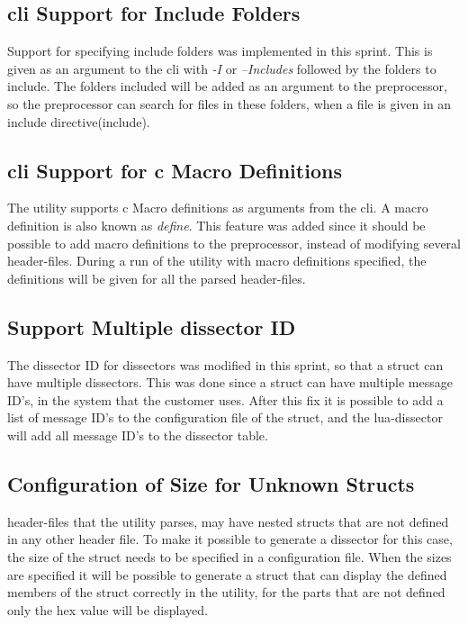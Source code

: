 \subsection{\gls{cli} Support for Include Folders}
Support for specifying include folders was implemented in this sprint. This is 
given as an argument to the \gls{cli} with \emph{-I} or \emph{--Includes} followed 
by the folders to include. The folders included will be added as an argument 
to the \gls{preprocessor}, so the \gls{preprocessor} can search for files in these 
folders, when a file is given in an include directive(\gls{include}).

\subsection{\gls{cli} Support for \Gls{c} Macro Definitions}
The \gls{utility} supports \Gls{c} Macro definitions as arguments from the \gls{cli}. A macro 
definition is also known as \emph{\gls{define}}. This feature was added since it 
should be possible to add macro definitions to the \gls{preprocessor}, instead of 
modifying several \gls{header}-files. During a run of the \gls{utility} with macro 
definitions specified, the definitions will be given for all the parsed 
\gls{header}-files.

\subsection{Support Multiple \gls{dissector} ID}
The \gls{dissector} ID for \glspl{dissector} was modified in this sprint, so that a \gls{struct} 
can have multiple \glspl{dissector}. This was done since a \gls{struct} can have multiple 
message ID's, in the system that the customer uses. After this fix it is 
possible to add a list of message ID's to the configuration file of the 
\gls{struct}, and the \Gls{lua}-\gls{dissector} will add all message ID's to the \gls{dissector} table.

\subsection{Configuration of Size for Unknown Structs}
\Gls{header}-files that the \gls{utility} parses, may have nested \glspl{struct} that are not 
defined in any other \gls{header} file. To make it possible to generate a 
\gls{dissector} for this case, the size of the \gls{struct} needs to be specified
in a configuration file. When the sizes are specified it will be possible to 
generate a \gls{struct} that can display the defined \glspl{member} of the \gls{struct} correctly 
in the \gls{utility}, for the parts that are not defined only the hex value will be 
displayed. 

